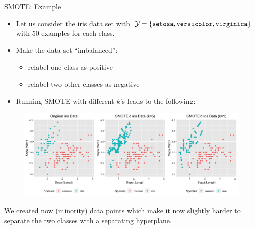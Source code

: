 \documentclass[11pt,compress,t,notes=noshow, xcolor=table]{beamer}
\begin{document}
	\begin{frame}{SMOTE: Example}
		\footnotesize
		
		\begin{itemize}
			\item Let us consider the iris data set with $\mathcal{Y}=\{ \texttt{setosa},\texttt{versicolor},\texttt{virginica}  \}$ with 50 examples for each class.
			
			\item Make the data set ``imbalanced'': 
            \begin{itemize}
                \footnotesize
                \item relabel one class as positive
                \item relabel two other classes as negative
            \end{itemize}
            
			\item Running SMOTE with different $k$'s leads to the following:
		\end{itemize}		
%		
		\begin{figure}
			\centering
			\includegraphics[width=0.8\linewidth]{figure_man/smoted_iris_data_ggplot.png}
		\end{figure}
		We created now (minority) data points which make it now slightly harder to separate the two classes with a separating hyperplane.
	\end{frame}
\end{document}

